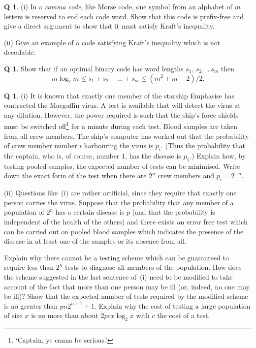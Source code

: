 \documentclass[12pt,a4paper]{article}
\theoremstyle{plain}
\theoremstyle{definition}
\newtheorem{question}[theorem]{Q}
\begin{document}
\begin{question}\label{C1.9} 
(i) In a \emph{comma code}, like
Morse code, one symbol from an alphabet of $m$ letters 
is reserved to end each code word. Show that
this code is prefix-free and give a direct
argument to show that it must satisfy Kraft's inequality.

(ii) Give an example of a code satisfying Kraft's inequality which 
is not decodable.
\end{question}
\begin{question}\label{C1.10} 
Show that if an optimal binary code has
word lengths $s_{1}$, $s_{2}$, \dots $s_{m}$ then
\[m\log_{2} m\leq s_{1}+s_{2}+\dots+s_{m}\leq (m^{2}+m-2)/2.\]
\end{question}
\begin{question}\label{C1.11} (i) It is known that 
exactly one member of the
starship Emphasise has contracted the Macguffin virus.
A test is available that will detect the virus at any dilution.
However, the power required is such that the ship's
force shields
must be switched off\footnote{`Captain, ye canna be serious.'}
for a minute during each test. Blood samples are taken
from all crew members. The ship's computer has worked
out that the probability of crew member number $i$
harbouring the virus is $p_{i}$. (Thus the probability that
the captain, who is, of course, number $1$, has the disease
is $p_{1}$.)   
Explain how, 
by testing pooled
samples, the expected number of tests can be minimised.
Write down the exact form of the test when there are $2^{n}$ 
crew members and $p_{i}=2^{-n}$.

(ii) Questions like~(i) are rather artificial,
since they require that exactly one person carries the virus.
Suppose that the probability that any member of a population
of $2^{n}$ has a certain disease is $p$ (and that
the probability is independent of the health of the others)
and there exists an error free test which can be carried out on pooled
blood samples which indicates the presence of the 
disease in at least one of the samples or its absence from all.

Explain why there cannot be a testing scheme
which can be guaranteed to require less than $2^{n}$
tests to diagnose all members of
the population. How does the scheme suggested
in the last sentence of~(i) need to be modified to take
account of the fact that more than one person 
may be ill (or, indeed, no one may be ill)?
Show that the expected number of tests required by
the modified scheme is no greater than
$pn2^{n+1}+1$. Explain why the cost of testing
a large population of size $x$ is no more than about
$2pcx\log_{2} x$ with $c$ the cost of a test.


\end{question}
\end{document}
